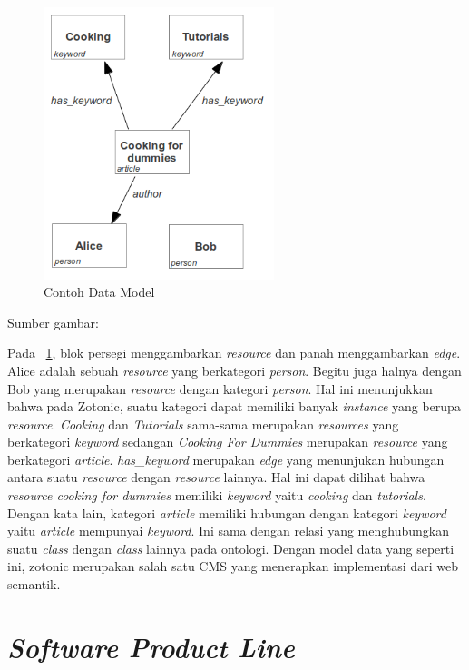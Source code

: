 \begin{figure}
	\centering
	\includegraphics[width=0.6\textwidth]
	{pics/dataModel.png}
	\caption{Contoh Data Model}
	\label{fig:dataModel}
\end{figure}
\vspace{-1cm}
\begin{center}
{\small Sumber gambar: \citep{zotonic.model}}
\end{center}

Pada \pic~\ref{fig:dataModel}, blok persegi menggambarkan \textit{resource} dan panah menggambarkan \textit{edge}. Alice adalah sebuah \textit{resource} yang berkategori \textit{person}. Begitu juga halnya dengan Bob yang merupakan \textit{resource} dengan kategori \textit{person}. Hal ini menunjukkan bahwa pada Zotonic, suatu kategori dapat memiliki banyak \textit{instance} yang berupa \textit{resource}. \textit{Cooking} dan \textit{Tutorials} sama-sama merupakan \textit{resources} yang berkategori \textit{keyword} sedangan \textit{Cooking For Dummies} merupakan \textit{resource} yang berkategori \textit{article}. \textit{has\_keyword} merupakan \textit{edge} yang menunjukan hubungan antara suatu \textit{resource} dengan \textit{resource} lainnya. Hal ini dapat dilihat bahwa \textit{resource cooking for dummies} memiliki \textit{keyword} yaitu \textit{cooking} dan \textit{tutorials}. Dengan kata lain, kategori \textit{article} memiliki hubungan dengan kategori \textit{keyword} yaitu \textit{article} mempunyai \textit{keyword}. Ini sama dengan relasi yang menghubungkan suatu \textit{class} dengan \textit{class} lainnya pada ontologi. Dengan model data yang seperti ini, zotonic merupakan salah satu CMS yang menerapkan implementasi dari web semantik.
\section{\textit{Software Product Line}}
